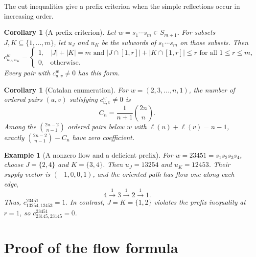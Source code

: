 \documentclass[11pt]{article}
\newtheorem{corollary}[theorem]{Corollary}
\newtheorem{example}[theorem]{Example}
\begin{document}
The cut inequalities give a prefix criterion when the simple reflections occur in increasing order.

\begin{corollary}[A prefix criterion]\label{cor:prefix}
Let $w=s_1\cdots s_m\in S_{m+1}$. For subsets $J,K\subseteq\{1,\ldots,m\}$, let $u_J$ and $u_K$ be the subwords of $s_1\cdots s_m$ on those subsets. Then
\begin{equation}\label{eq:prefix}
 c_{u_J,u_K}^{w}=
 \begin{cases}
 1,& |J|+|K|=m\text{ and }|J\cap[1,r]|+|K\cap[1,r]|\leq r
       \text{ for all }1\leq r\leq m,\\
 0,&\text{otherwise}.
 \end{cases}
\end{equation}
Every pair with $c_{u,v}^{w}\ne0$ has this form.
\end{corollary}

\begin{corollary}[Catalan enumeration]\label{cor:catalan}
For $w=(2,3,\ldots,n,1)$, the number of ordered pairs $(u,v)$ satisfying $c_{u,v}^{w}\ne0$ is
\[
 C_n=\frac{1}{n+1}\binom{2n}{n}.
\]
Among the $\binom{2n-2}{n-1}$ ordered pairs below $w$ with $\ell(u)+\ell(v)=n-1$, exactly $\binom{2n-2}{n-1}-C_n$ have zero coefficient.
\end{corollary}

\begin{example}[A nonzero flow and a deficient prefix]
For $w=23451=s_1s_2s_3s_4$, choose $J=\{2,4\}$ and $K=\{3,4\}$. Then $u_J=13254$ and $u_K=12453$. Their supply vector is $(-1,0,0,1)$, and the oriented path has flow one along each edge,
\[
 4\xrightarrow{\,1\,}3\xrightarrow{\,1\,}2\xrightarrow{\,1\,}1.
\]
Thus, $c_{13254,12453}^{23451}=1$. In contrast, $J=K=\{1,2\}$ violates the prefix inequality at $r=1$, so $c_{23145,23145}^{23451}=0$.
\end{example}

\section{Proof of the flow formula}
\end{document}
